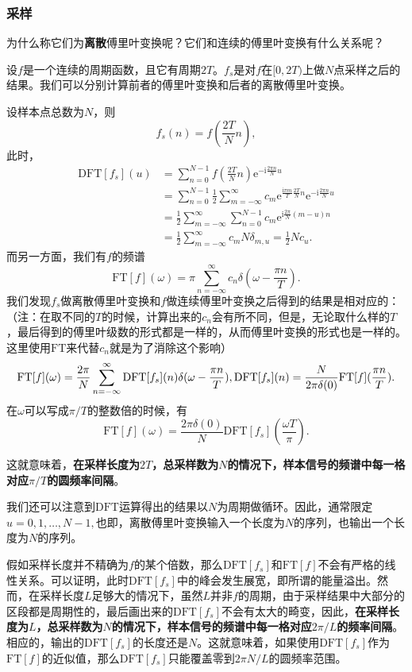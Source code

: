 \documentclass[UTF8]{ctexart}
\newcommand*{\ee}{\mathrm{e}}
\begin{document}
\hypertarget{ux91c7ux6837}{%
\subsubsection{采样}\label{ux91c7ux6837}}

为什么称它们为\textbf{离散}傅里叶变换呢？它们和连续的傅里叶变换有什么关系呢？

设$f$是一个连续的周期函数，且它有周期$2T$。$f_s$是对$f$在$[0, 2T)$上做$N$点采样之后的结果。我们可以分别计算前者的傅里叶变换和后者的离散傅里叶变换。

设样本点总数为$N$，则
\[
f_s (n) = f \left( \frac{2T}{N}n \right),
\]
此时，
\[
\begin{aligned}
    \mathrm{DFT}[f_s](u) &= \sum_{n=0}^{N-1} f\left( \frac{2T}{N}n \right) \ee^{-\mathrm{i} \frac{2\pi n}{N}u} \\
    &= \sum_{n=0}^{N-1} \frac{1}{2} \sum_{m = -\infty}^{\infty} c_m \ee^{\frac{\mathrm{i}\pi m}{T} \frac{2T}{N}n } \ee^{-\mathrm{i} \frac{2\pi n}{N}u} \\
    &= \frac{1}{2} \sum_{m=-\infty}^\infty \sum_{n=0}^{N-1} c_m \ee^{\mathrm{i}\frac{2\pi}{N} (m-u)n} \\
    &= \frac{1}{2} \sum_{m=-\infty}^\infty c_m N \delta_{m,u} = \frac{1}{2} N c_u.
\end{aligned}
\]
而另一方面，我们有$f$的频谱
\[
\mathrm{FT}[f](\omega) = \pi \sum_{n=-\infty}^\infty c_n \delta(\omega - \frac{\pi n}{T}).
\]
我们发现$f_s$做离散傅里叶变换和$f$做连续傅里叶变换之后得到的结果是相对应的：（注：在取不同的$T$的时候，计算出来的$c_n$会有所不同，但是，无论取什么样的$T$，最后得到的傅里叶级数的形式都是一样的，从而傅里叶变换的形式也是一样的。这里使用$\mathrm{FT}$来代替$c_n$就是为了消除这个影响）
\[
\mathrm{FT}[f](\omega) = \frac{2\pi}{N} \sum_{n=-\infty}^\infty \mathrm{DFT}[f_s](n) \delta(\omega - \frac{\pi n}{T}), \\
\mathrm{DFT}[f_s](n) = \frac{N}{2\pi \delta(0)} \mathrm{FT}[f](\frac{\pi n}{T}).
\]
在$\omega$可以写成$\pi/T$的整数倍的时候，有
\[
\mathrm{FT}[f](\omega) = \frac{2\pi \delta(0)}{N} \mathrm{DFT}[f_s](\frac{\omega T}{\pi}).
\]

这就意味着，\textbf{在采样长度为$2T$，总采样数为$N$的情况下，样本信号的频谱中每一格对应$\pi/T$的圆频率间隔}。

我们还可以注意到$\mathrm{DFT}$运算得出的结果以$N$为周期做循环。因此，通常限定$u=0, 1, \ldots, N-1,$也即，离散傅里叶变换输入一个长度为$N$的序列，也输出一个长度为$N$的序列。

假如采样长度并不精确为$f$的某个倍数，那么$\mathrm{DFT}[f_s]$和$\mathrm{FT}[f]$不会有严格的线性关系。可以证明，此时$\mathrm{DFT}[f_s]$中的峰会发生展宽，即所谓的能量溢出。然而，在采样长度$L$足够大的情况下，虽然$L$并非$f$的周期，由于采样结果中大部分的区段都是周期性的，最后画出来的$\mathrm{DFT}[f_s]$不会有太大的畸变，因此，\textbf{在采样长度为$L$，总采样数为$N$的情况下，样本信号的频谱中每一格对应$2\pi/L$的频率间隔}。相应的，输出的$\mathrm{DFT}[f_s]$的长度还是$N$。这就意味着，如果使用$\mathrm{DFT}[f_s]$作为$\mathrm{FT}[f]$的近似值，那么$\mathrm{DFT}[f_s]$只能覆盖零到$2\pi N/L$的圆频率范围。
\end{document}
